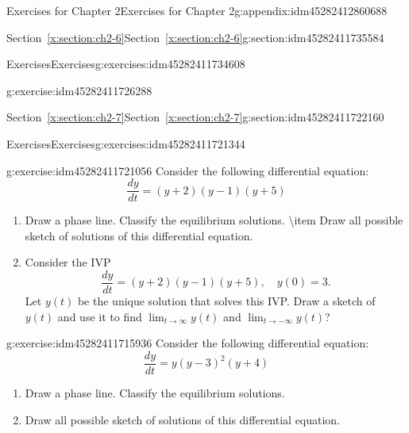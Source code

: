 \documentclass[oneside,10pt,]{book}
\numberwithin{equation}{section}
\numberwithin{equation}{section}
\begin{document}
\begin{appendixptx}{Exercises for Chapter 2}{}{Exercises for Chapter 2}{}{}{g:appendix:idm45282412860688}
\begin{sectionptx}{Section~\ref*{x:section:ch2-6}}{}{Section~\ref*{x:section:ch2-6}}{}{}{g:section:idm45282411735584}
\begin{exercises-subsection-numberless}{Exercises}{}{Exercises}{}{}{g:exercises:idm45282411734608}
\begin{divisionexercise}{5}{}{}{g:exercise:idm45282411726288}
\begin{enumerate}[label=(\alph*)]
\end{enumerate}
\end{divisionexercise}%
\end{exercises-subsection-numberless}
\end{sectionptx}
%
%
\typeout{************************************************}
\typeout{************************************************}
%
\begin{sectionptx}{Section~\ref*{x:section:ch2-7}}{}{Section~\ref*{x:section:ch2-7}}{}{}{g:section:idm45282411722160}
%
%
\typeout{************************************************}
\typeout{************************************************}
%
\begin{exercises-subsection-numberless}{Exercises}{}{Exercises}{}{}{g:exercises:idm45282411721344}
\begin{divisionexercise}{1}{}{}{g:exercise:idm45282411721056}%
Consider the following differential equation:%
\begin{equation*}
\frac{dy}{dt}=\left(y+2\right)\left(y-1\right)\left(y+5\right)
\end{equation*}
%
%
\begin{enumerate}[label=(\alph*)]
\item{}Draw a phase line. Classify the equilibrium solutions. \textbackslash{}item Draw all possible sketch of solutions of this differential equation.%
\item{}Consider the IVP%
\begin{equation*}
\frac{dy}{dt}=\left(y+2\right)\left(y-1\right)\left(y+5\right),\,\,\,\,\,\,y(0)=3.
\end{equation*}
Let \(y(t)\) be the unique solution that solves this IVP. Draw a sketch of \(y(t)\) and use it to find \(\lim_{t\to\infty}y(t)\) and \(\lim_{t\to-\infty}y(t)\)?%
\end{enumerate}
\end{divisionexercise}%
\begin{divisionexercise}{2}{}{}{g:exercise:idm45282411715936}%
Consider the following differential equation:%
\begin{equation*}
\frac{dy}{dt}=y\left(y-3\right)^{2}\left(y+4\right)
\end{equation*}
%
%
\begin{enumerate}[label=(\alph*)]
\item{}Draw a phase line. Classify the equilibrium solutions.%
\item{}Draw all possible sketch of solutions of this differential equation.%

\end{enumerate}
\end{divisionexercise}
\end{exercises-subsection-numberless}
\end{sectionptx}
\end{appendixptx}
\end{document}
